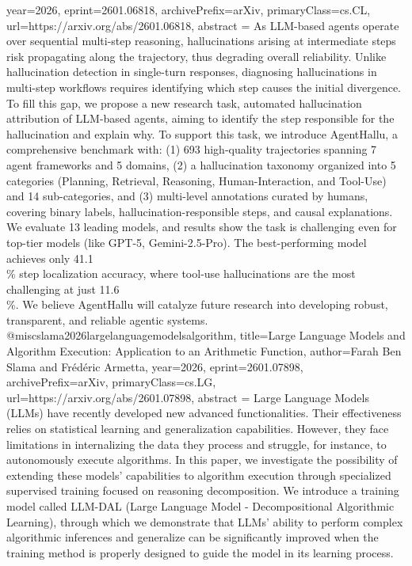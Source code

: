 {      year={2026},
      eprint={2601.06818},
      archivePrefix={arXiv},
      primaryClass={cs.CL},
      url={https://arxiv.org/abs/2601.06818},
      abstract = {As LLM-based agents operate over sequential multi-step reasoning, hallucinations arising at intermediate steps risk propagating along the trajectory, thus degrading overall reliability. Unlike hallucination detection in single-turn responses, diagnosing hallucinations in multi-step workflows requires identifying which step causes the initial divergence. To fill this gap, we propose a new research task, automated hallucination attribution of LLM-based agents, aiming to identify the step responsible for the hallucination and explain why. To support this task, we introduce AgentHallu, a comprehensive benchmark with: (1) 693 high-quality trajectories spanning 7 agent frameworks and 5 domains, (2) a hallucination taxonomy organized into 5 categories (Planning, Retrieval, Reasoning, Human-Interaction, and Tool-Use) and 14 sub-categories, and (3) multi-level annotations curated by humans, covering binary labels, hallucination-responsible steps, and causal explanations. We evaluate 13 leading models, and results show the task is challenging even for top-tier models (like GPT-5, Gemini-2.5-Pro). The best-performing model achieves only 41.1\\\% step localization accuracy, where tool-use hallucinations are the most challenging at just 11.6\\\%. We believe AgentHallu will catalyze future research into developing robust, transparent, and reliable agentic systems.}
}@misc{slama2026largelanguagemodelsalgorithm,
      title={Large Language Models and Algorithm Execution: Application to an Arithmetic Function}, 
      author={Farah Ben Slama and Frédéric Armetta},
      year={2026},
      eprint={2601.07898},
      archivePrefix={arXiv},
      primaryClass={cs.LG},
      url={https://arxiv.org/abs/2601.07898},
      abstract = {Large Language Models (LLMs) have recently developed new advanced functionalities. Their effectiveness relies on statistical learning and generalization capabilities. However, they face limitations in internalizing the data they process and struggle, for instance, to autonomously execute algorithms. In this paper, we investigate the possibility of extending these models' capabilities to algorithm execution through specialized supervised training focused on reasoning decomposition. We introduce a training model called LLM-DAL (Large Language Model - Decompositional Algorithmic Learning), through which we demonstrate that LLMs' ability to perform complex algorithmic inferences and generalize can be significantly improved when the training method is properly designed to guide the model in its learning process.}
}
